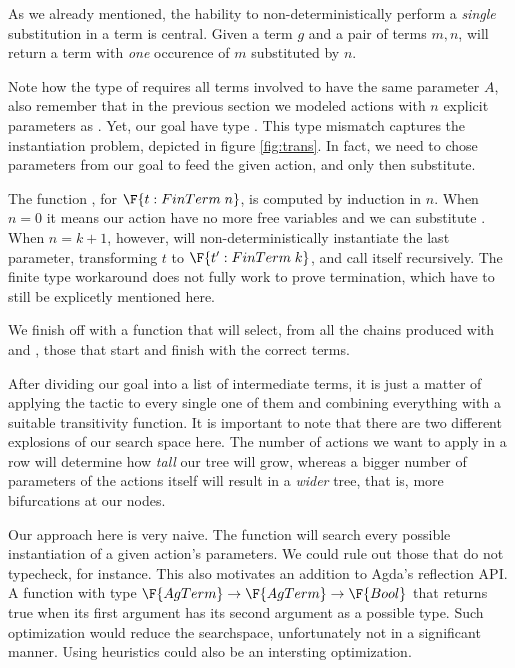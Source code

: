 As we already mentioned, the hability to non-deterministically perform a \emph{single} substitution
in a term is central. Given a term $g$ and a pair of terms $m , n$,  will return
a term with \emph{one} occurence of $m$ substituted by $n$. 


Note how the type of \F{$\_[\_] $} requires all terms involved to have the same parameter $A$,
also remember that in the previous section we modeled actions with $n$ explicit parameters as .
Yet, our goal have type . This type mismatch captures the instantiation problem,
depicted in figure \ref{fig:trans}. In fact, we need to chose parameters from our goal to feed
the given action, and only then substitute. 


The function , for $\F{t : FinTerm\; n}$, is computed by induction in $n$.
When $n = 0$ it means our action have no more free variables and we can substitute . 
When $n = k + 1$, however,  will non-deterministically
instantiate the last parameter, transforming $t$ to $\F{t' : FinTerm\; k}$, and call itself recursively.
The finite type workaround does not fully work to prove termination, which have to still be explicetly mentioned here.

We finish off with a function that will select, from all the chains produced with \F{$\_[\_]$} and ,
those that start and finish with the correct terms.


After dividing our goal into a list of intermediate terms, it is just a matter of applying the
tactic to every single one of them and combining everything with a suitable transitivity function.
It is important to note that there are two different explosions of our search space here. The
number of actions we want to apply in a row will determine how \emph{tall} our tree will grow,
whereas a bigger number of parameters of the actions itself will result in a \emph{wider} tree, that is,
more bifurcations at our nodes.

Our approach here is very naive. The  function will search every possible instantiation
of a given action's parameters. We could rule out those that do not typecheck, for instance.
This also motivates an addition to Agda's reflection API. A function with type $\F{AgTerm} \rightarrow \F{AgTerm} \rightarrow \F{Bool}$ that returns true when its first argument has its second argument as a possible type.
Such optimization would reduce the searchspace, unfortunately not in a significant manner.
Using heuristics could also be an intersting optimization.


